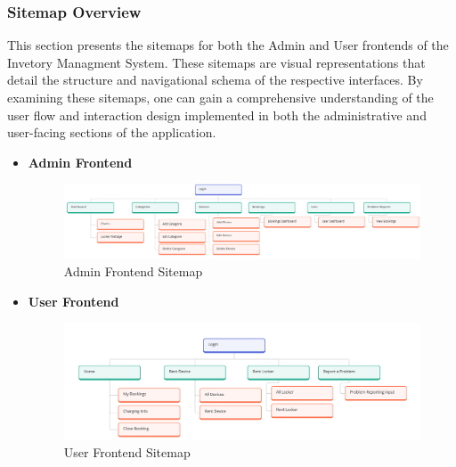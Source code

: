 \subsubsection{Sitemap Overview}
This section presents the sitemaps for both the Admin and User frontends of the Invetory Managment System. These sitemaps are visual representations that detail the structure and navigational schema of the respective interfaces. By examining these sitemaps, one can gain a comprehensive understanding of the user flow and interaction design implemented in both the administrative and user-facing sections of the application.
\begin{itemize}
\item \textbf {Admin Frontend}
\begin{figure}[h]
    \centering
    \includegraphics[width=1\textwidth]{images/Sitemap.jpg}
    \caption{Admin Frontend Sitemap}
    \label{fig:myimage}
\end{figure}
\item \textbf {User Frontend}
\begin{figure}[h]
    \centering
    \includegraphics[width=1\textwidth]{images/usersitemap.jpg}
    \caption{User Frontend Sitemap}
    \label{fig:myimage}
\end{figure}
\end{itemize}

